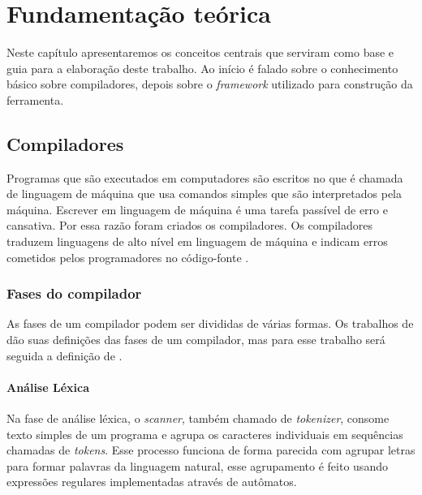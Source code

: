 \chapter{Fundamentação teórica}
\label{cap:fundamentacao-teorica}

Neste capítulo apresentaremos os conceitos centrais que serviram como base e guia para a elaboração deste trabalho. Ao início é falado sobre o conhecimento básico sobre compiladores, depois sobre o \textit{framework} utilizado para construção da ferramenta.

\section{Compiladores}
Programas que são executados em computadores são escritos no que é chamada de linguagem de máquina que usa comandos simples que são interpretados pela máquina. Escrever em linguagem de máquina é uma tarefa passível de erro e cansativa. Por essa razão foram criados os compiladores. Os compiladores traduzem linguagens de alto nível em linguagem de máquina e indicam erros cometidos pelos programadores no código-fonte \cite{mogensen2024introduction}.

\subsection{Fases do compilador}
As fases de um compilador podem ser divididas de várias formas. Os trabalhos de \textcite{cooper2022engineering,mogensen2024introduction, thain2020introduction} dão suas definições das fases de um compilador, mas para esse trabalho será seguida a definição de \textcite{thain2020introduction}.

\begin{figure}[ht]
    \captionsetup{width=16cm}
\end{figure}

\subsubsection{Análise Léxica}
Na fase de análise léxica, o \textit{scanner}, também chamado de \textit{tokenizer}, consome texto simples de um programa e agrupa os caracteres individuais em sequências chamadas de \textit{tokens}. Esse processo funciona de forma parecida com agrupar letras para formar palavras da linguagem natural, esse agrupamento é feito usando expressões regulares implementadas através de autômatos.

